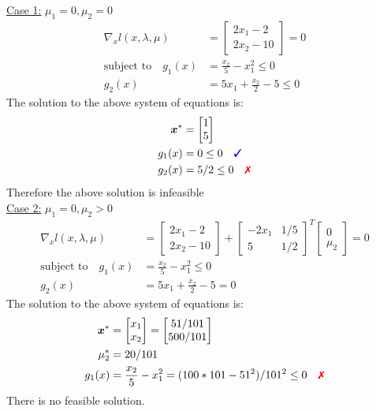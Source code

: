 \documentclass[a4paper,11pt]{article}
\newcommand{\V}[1]{\boldsymbol{#1}}
\newcommand{\mat}[1]{\begin{bmatrix}#1\end{bmatrix}}
\newcommand{\cmark}{{\color{blue}\text{\ding{51}}}}%
\newcommand{\xmark}{{\color{red}\text{\ding{55}}}}%
\begin{document}
\noindent\underline{Case 1:} $\mu_1=0, \mu_2=0$
\begin{align*}
 \nabla_x l(x,\lambda,\mu) &= \mat{2x_1 -2\\ 2x_2-10}=0\\
 \text{subject to}\quad g_1(x)&=\frac{x_2}{5}-x_1^2 \leq 0\\
 g_2(x)&=5x_1 +\frac{x_2}{2}-5\leq 0
\end{align*}
The solution to the above system of equations is:
\begin{align*}
 \V{x}^* &= \mat{1\\5}\\
 g_1(x)&= 0 \leq 0 \quad\cmark\\
 g_2(x)&= 5/2 \leq 0 \quad\xmark
\end{align*}
Therefore the above solution is infeasible\\

\noindent\underline{Case 2:} $\mu_1=0, \mu_2>0$
\begin{align*}
 \nabla_x l(x,\lambda,\mu) &= \mat{2x_1 -2\\ 2x_2-10} +\mat{-2x_1 & 1/5\\ 5& 1/2}^T\mat{0\\ \mu_2} =0\\
 \text{subject to}\quad g_1(x)&=\frac{x_2}{5}-x_1^2 \leq 0\\
 g_2(x)&=5x_1 +\frac{x_2}{2}-5= 0
\end{align*}
The solution to the above system of equations is:
\begin{align*}
 \V{x}^* &= \mat{x_1\\x_2} = \mat{51/101\\ 500/101}\\
 \mu_2^*& = 20/101\\
 g_1(x)&=\frac{x_2}{5}-x_1^2 = (100*101-51^2)/101^2 \leq 0 \quad \xmark
\end{align*}
There is no feasible solution.

\end{document}

